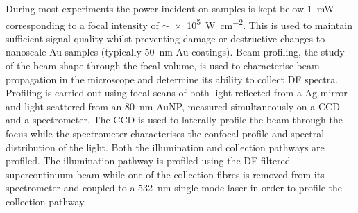 \documentclass{article}
\begin{document}
During most experiments the power incident on samples is kept below \SI{1}{mW} corresponding to a focal intensity of $\sim$\SI{e5}{\watt\per\centi\metre\squared}. This is used to maintain sufficient signal quality whilst preventing damage or destructive changes to nanoscale Au samples (typically \SI{50}{nm} Au coatings). Beam profiling, the study of the beam shape through the focal volume, is used to characterise beam propagation in the microscope and determine its ability to collect DF spectra. Profiling is carried out using focal scans of both light reflected from a Ag mirror and light scattered from an \SI{80}{nm} AuNP, measured simultaneously on a CCD and a spectrometer. The CCD is used to laterally profile the beam through the focus while the spectrometer characterises the confocal profile and spectral distribution of the light. Both the illumination and collection pathways are profiled. The illumination pathway is profiled using the DF-filtered supercontinuum beam while one of the collection fibres is removed from its spectrometer and coupled to a \SI{532}{nm} single mode laser in order to profile the collection pathway.
\end{document}
